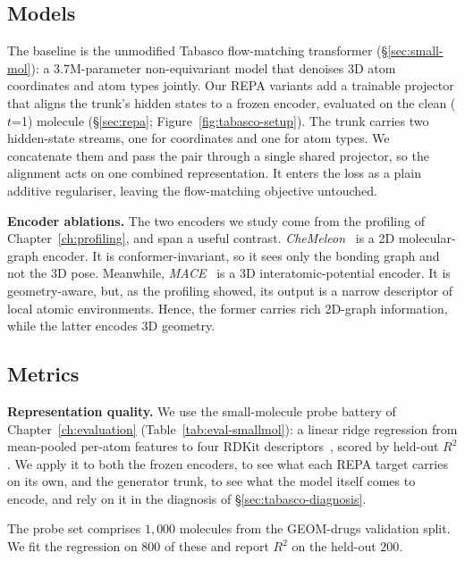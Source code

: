 \documentclass[12pt,a4paper,twoside]{report}
\begin{document}
\subsection{Models}
\label{sec:tabasco-models}

The baseline is the unmodified Tabasco flow-matching transformer (\S\ref{sec:small-mol}): a 3.7M-parameter non-equivariant model that denoises 3D atom coordinates and atom types jointly. Our REPA variants add a trainable projector that aligns the trunk's hidden states to a frozen encoder, evaluated on the clean ($t$=1) molecule (\S\ref{sec:repa}; Figure~\ref{fig:tabasco-setup}). The trunk carries two hidden-state streams, one for coordinates and one for atom types. We concatenate them and pass the pair through a single shared projector, so the alignment acts on one combined representation. It enters the loss as a plain additive regulariser, leaving the flow-matching objective untouched.



\textbf{Encoder ablations.} The two encoders we study come from the profiling of Chapter~\ref{ch:profiling}, and span a useful contrast. \emph{CheMeleon}~\cite{CheMeleon} is a 2D molecular-graph encoder. It is conformer-invariant, so it sees only the bonding graph and not the 3D pose. Meanwhile, \emph{MACE}~\cite{MACE,MACEOFF} is a 3D interatomic-potential encoder. It is geometry-aware, but, as the profiling showed, its output is a narrow descriptor of local atomic environments. Hence, the former carries rich 2D-graph information, while the latter encodes 3D geometry.



\subsection{Metrics}
\label{sec:tabasco-metrics}

\textbf{Representation quality.} We use the small-molecule probe battery of Chapter~\ref{ch:evaluation} (Table~\ref{tab:eval-smallmol}): a linear ridge regression from mean-pooled per-atom features to four RDKit descriptors~\cite{RDKit}, scored by held-out $R^2$. We apply it to both the frozen encoders, to see what each REPA target carries on its own, and the generator trunk, to see what the model itself comes to encode, and rely on it in the diagnosis of \S\ref{sec:tabasco-diagnosis}.

The probe set comprises $1{,}000$ molecules from the GEOM-drugs validation split. We fit the regression on $800$ of these and report $R^2$ on the held-out $200$.
\end{document}
